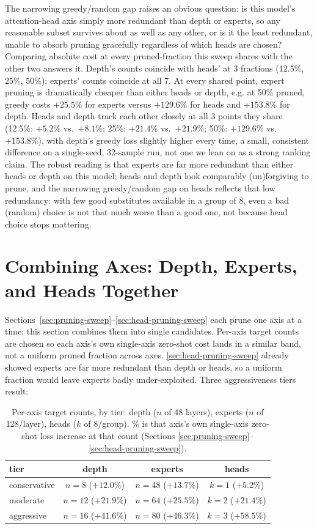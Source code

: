 \documentclass{article}
\theoremstyle{plain}
\theoremstyle{definition}
\theoremstyle{remark}
\begin{document}
The narrowing greedy/random gap raises an obvious question: is this
model's attention-head axis simply more redundant than depth or experts,
so any reasonable subset survives about as well as any other, or is it
the least redundant, unable to absorb pruning gracefully regardless of
which heads are chosen? Comparing absolute cost at every pruned-fraction
this sweep shares with the other two answers it. Depth's counts coincide
with heads' at 3 fractions (12.5\%, 25\%, 50\%); experts' counts coincide
at all 7. At every shared point, expert pruning is dramatically cheaper
than either heads or depth, e.g. at 50\% pruned, greedy costs
$+25.5\%$ for experts versus $+129.6\%$ for heads and $+153.8\%$ for
depth. Heads and depth track each other closely at all 3 points they
share (12.5\%: $+5.2\%$ vs.\ $+8.1\%$; 25\%: $+21.4\%$ vs.\ $+21.9\%$;
50\%: $+129.6\%$ vs.\ $+153.8\%$), with depth's greedy loss slightly
higher every time, a small, consistent difference on a single-seed,
32-sample run, not one we lean on as a strong ranking claim. The robust
reading is that experts are far more redundant than either heads or
depth on this model; heads and depth look comparably (un)forgiving to
prune, and the narrowing greedy/random gap on heads reflects that
low redundancy: with few good substitutes available in a group of 8,
even a bad (random) choice is not that much worse than a good one, not
because head choice stops mattering.

\section{Combining Axes: Depth, Experts, and Heads Together}
\label{sec:combined-pruning-sweep}

Sections~\ref{sec:pruning-sweep}--\ref{sec:head-pruning-sweep} each prune
one axis at a time; this section combines them into single candidates.
Per-axis target counts are chosen so each axis's own single-axis
zero-shot cost lands in a similar band, not a uniform pruned fraction
across axes. \cref{sec:head-pruning-sweep} already showed experts are
far more redundant than depth or heads, so a uniform fraction would leave
experts badly under-exploited. Three aggressiveness tiers result:

\begin{table}[t]
\centering
\scriptsize
\setlength{\tabcolsep}{3pt}
\begin{tabular}{lccc}
\toprule
tier & depth & experts & heads \\
\midrule
conservative & $n{=}8$ ($+12.0\%$) & $n{=}48$ ($+13.7\%$) & $k{=}1$ ($+5.2\%$) \\
moderate & $n{=}12$ ($+21.9\%$) & $n{=}64$ ($+25.5\%$) & $k{=}2$ ($+21.4\%$) \\
aggressive & $n{=}16$ ($+41.6\%$) & $n{=}80$ ($+46.3\%$) & $k{=}3$ ($+58.5\%$) \\
\bottomrule
\end{tabular}
\caption{Per-axis target counts, by tier: depth ($n$ of 48 layers),
experts ($n$ of 128/layer), heads ($k$ of 8/group). \% is that axis's own
single-axis zero-shot loss increase at that count (Sections
\ref{sec:pruning-sweep}--\ref{sec:head-pruning-sweep}).}
\label{table:combined-tiers}
\end{table}
\end{document}
